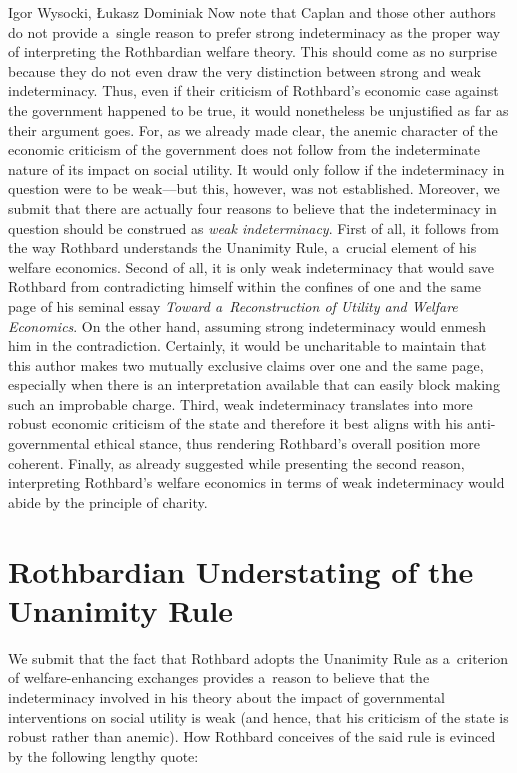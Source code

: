 \begin{artengenv}{Igor Wysocki, Łukasz Dominiak}
Now note that Caplan and those other authors do not provide a~single reason to prefer strong indeterminacy as the proper way of interpreting the Rothbardian welfare theory. This should come as no surprise because they do not even draw the very distinction between strong and weak indeterminacy. Thus, even if their criticism of Rothbard's economic case against the government happened to be true, it would nonetheless be unjustified as far as their argument goes. For, as we already made clear, the anemic character of the economic criticism of the government does not follow from the indeterminate nature of its impact on social utility. It would only follow if the indeterminacy in question were to be weak---but this, however, was not established. Moreover, we submit that there are actually four reasons to believe that the indeterminacy in question should be construed as \textit{weak indeterminacy}. First of all, it follows from the way Rothbard understands the Unanimity Rule, a~crucial element of his welfare economics. Second of all, it is only weak indeterminacy that would save Rothbard from contradicting himself within the confines of one and the same page of his seminal essay \textit{Toward a~Reconstruction of Utility and Welfare Economics}. On the other hand, assuming strong indeterminacy would enmesh him in the contradiction. Certainly, it would be uncharitable to maintain that this author makes two mutually exclusive claims over one and the same page, especially when there is an interpretation available that can easily block making such an improbable charge. Third, weak indeterminacy translates into more robust economic criticism of the state and therefore it best aligns with his anti-governmental ethical stance, thus rendering Rothbard's overall position more coherent. Finally, as already suggested while presenting the second reason, interpreting Rothbard's welfare economics in terms of weak indeterminacy would abide by the principle of charity.



\section{Rothbardian Understating of the Unanimity Rule }

We submit that the fact that Rothbard adopts the Unanimity Rule as a~criterion of welfare-enhancing exchanges provides a~reason to believe that the indeterminacy involved in his theory about the impact of governmental interventions on social utility is weak (and hence, that his criticism of the state is robust rather than anemic). How Rothbard conceives of the said rule is evinced by the following lengthy quote:




\end{artengenv}
